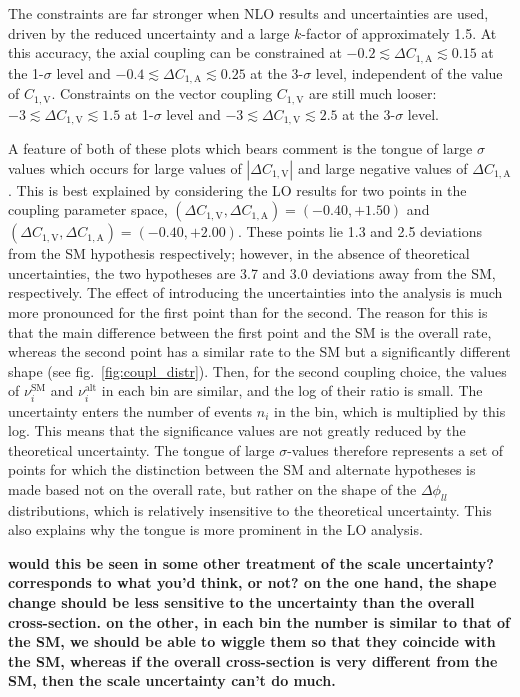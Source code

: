 \documentclass[preprint]{JHEP3} %
\newcommand{\SM}{\mathrm{SM}}
\newcommand{\alt}{\mathrm{alt}}
\def\Dphill{\Delta \phi_{ll}}
\def\ConeV{C_{1,\mathrm{V}}}
\def\DConeA{\Delta C_{1,\mathrm{A}}}
\def\DConeV{\Delta C_{1,\mathrm{V}}}
\begin{document}
The constraints are far stronger when NLO results and uncertainties are used, driven by the reduced uncertainty and a large $k$-factor of approximately 1.5. 
At this accuracy, the axial coupling can be constrained at $-0.2 \lesssim \DConeA \lesssim 0.15$ at the 1-$\sigma$ level and $-0.4 \lesssim \DConeA \lesssim 0.25$ 
at the 3-$\sigma$ level, independent of the value of $\ConeV$. Constraints on the vector coupling $\ConeV$ are still much looser: 
$-3 \lesssim \DConeV \lesssim 1.5$ at 1-$\sigma$ level and $-3 \lesssim \DConeV \lesssim 2.5$ at the 3-$\sigma$ level.

A feature of both of these plots which bears comment is the tongue of large $\sigma$ values which occurs for large values of $| \DConeV|$ and large 
negative values of $\DConeA$. This is best explained by considering the LO results for two points in the coupling parameter space, 
$(\DConeV,\DConeA)=(-0.40,+1.50)$ and $(\DConeV,\DConeA)=(-0.40,+2.00)$. These points lie 1.3 and 2.5 deviations from the SM hypothesis respectively; 
however, in the absence of theoretical uncertainties, the two hypotheses are 3.7 and 3.0 deviations away from the SM, respectively. 
The effect of introducing the uncertainties into the analysis is much more pronounced for the first point than for the second. 
The reason for this is that the main difference between the first point and the SM is the overall rate, whereas the second point has a similar rate to the 
SM but a significantly different shape (see fig.~\ref{fig:coupl_distr}). Then, for the second coupling choice, the values of $\nu_i^{\SM}$ and $\nu_i^{\alt}$ 
in each bin are similar, and the 
log of their ratio is small. The uncertainty enters the number of events $n_i$ in the bin, which is multiplied by this log. 
This means that the significance values are not greatly reduced by the theoretical uncertainty. 
The tongue of large $\sigma$-values therefore represents a set of points for which the distinction between the SM and alternate hypotheses 
is made based not on the overall rate, but rather on the shape of the $\Dphill$ distributions, which is relatively insensitive to the theoretical uncertainty. 
This also explains why the tongue is more prominent in the LO analysis.

{\bf would this be seen in some other treatment of the scale uncertainty? corresponds to what you'd think, or not? on the one hand, 
the shape change should be less sensitive to the uncertainty than the overall cross-section. on the other, in each bin the number is similar to that of the SM, 
we should be able to wiggle them so that they coincide with the SM, whereas if the overall cross-section is very different from the SM, 
then the scale uncertainty can't do much. } 
\end{document}
